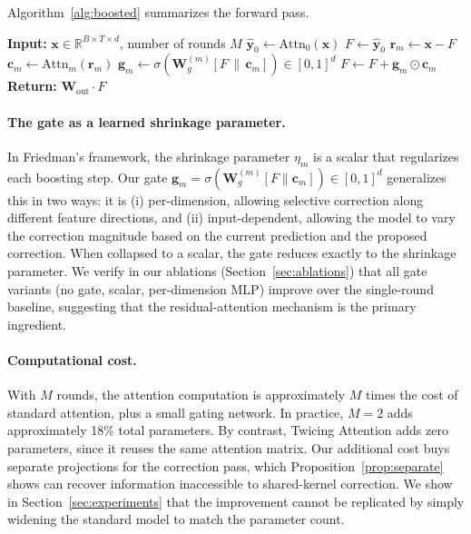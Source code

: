 \documentclass{article}
\theoremstyle{definition}
\begin{document}
Algorithm~\ref{alg:boosted} summarizes the forward pass.
\begin{algorithm}[t]
\caption{Gradient-Boosted Attention Forward Pass}
\label{alg:boosted}
\begin{algorithmic}[1]
\STATE \textbf{Input:} $\mathbf{x} \in \mathbb{R}^{B \times T \times d}$, number of rounds $M$
\STATE $\hat{\mathbf{y}}_0 \leftarrow \mathrm{Attn}_0(\mathbf{x})$ \hfill {}
\STATE $F \leftarrow \hat{\mathbf{y}}_0$
    \STATE $\mathbf{r}_m \leftarrow \mathbf{x} - F$ \hfill {}
    \STATE $\mathbf{c}_m \leftarrow \mathrm{Attn}_m(\mathbf{r}_m)$ \hfill {}
    \STATE $\mathbf{g}_m \leftarrow \sigma\!\left(\mathbf{W}_g^{(m)}[F \,\|\, \mathbf{c}_m]\right) \in [0,1]^d$ \hfill {}
    \STATE $F \leftarrow F + \mathbf{g}_m \odot \mathbf{c}_m$ \hfill {}
\ENDFOR
\STATE \textbf{Return:} $\mathbf{W}_{\mathrm{out}} \cdot F$
\end{algorithmic}
\end{algorithm}

\paragraph{The gate as a learned shrinkage parameter.}
In Friedman's framework, the shrinkage parameter $\eta_m$ is a scalar that regularizes each boosting step.
Our gate $\mathbf{g}_m = \sigma(\mathbf{W}_g^{(m)}[F \| \mathbf{c}_m]) \in [0,1]^d$ generalizes this in two ways: it is (i) per-dimension, allowing selective correction along different feature directions, and (ii) input-dependent, allowing the model to vary the correction magnitude based on the current prediction and the proposed correction.
When collapsed to a scalar, the gate reduces exactly to the shrinkage parameter.
We verify in our ablations (Section~\ref{sec:ablations}) that all gate variants (no gate, scalar, per-dimension MLP) improve over the single-round baseline, suggesting that the residual-attention mechanism is the primary ingredient.

\paragraph{Computational cost.}
With $M$ rounds, the attention computation is approximately $M$ times the cost of standard attention, plus a small gating network.
In practice, $M = 2$ adds approximately 18\% total parameters.
By contrast, Twicing Attention \citep{abdullaev2025twicing} adds zero parameters, since it reuses the same attention matrix.
Our additional cost buys separate projections for the correction pass, which Proposition~\ref{prop:separate} shows can recover information inaccessible to shared-kernel correction.
We show in Section~\ref{sec:experiments} that the improvement cannot be replicated by simply widening the standard model to match the parameter count.
\end{document}
